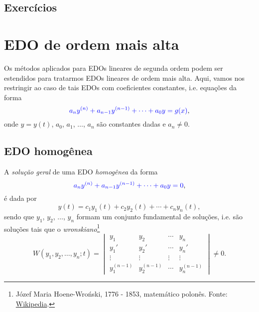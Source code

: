 \subsection*{Exercícios}

\emconstrucao

\section{EDO de ordem mais alta}\label{cap_edolin_sec_edon}

Os métodos aplicados para EDOs lineares de segunda ordem podem ser estendidos para tratarmos EDOs lineares de ordem mais alta. Aqui, vamos nos restringir ao caso de tais EDOs com coeficientes constantes, i.e. equações da forma
\begin{equation}
  {\color{blue}a_ny^{(n)} + a_{n-1}y^{(n-1)} + \cdots + a_0y = g(x)},
\end{equation}
onde $y = y(t)$, $a_0$, $a_1$, $\dotsc$, $a_{n}$ são constantes dadas e $a_n\neq 0$.

\subsection{EDO homogênea}

A \emph{solução geral} de uma EDO \emph{homogênea} da forma
\begin{equation}
  {\color{blue}a_ny^{(n)} + a_{n-1}y^{(n-1)} + \cdots + a_0y = 0},
\end{equation}
é dada por
\begin{equation}
  y(t) = c_1y_1(t) + c_2y_2(t) + \cdots + c_ny_n(t),
\end{equation}
sendo que $y_1$, $y_2$, $\dotsc$, $y_n$ formam um conjunto fundamental de soluções, i.e. são soluções tais que o \emph{wronskiano}\footnote{Józef Maria Hoene-Wroński, 1776 - 1853, matemático polonês. Fonte: \href{https://en.wikipedia.org/w/index.php?title=J\%C3\%B3zef_Maria_Hoene-Wro\%C5\%84ski\&oldid=939986060}{Wikipedia}.}
\begin{equation}
  W(y_1,y_2,\dotsc,y_n;t) =
  \begin{vmatrix}
    y_1 & y_2 & \cdots & y_n \\
    y_1' & y_2' & \cdots & y_n' \\
    \vdots & \vdots & \vdots & \vdots \\
    y_1^{(n-1)} & y_2^{(n-1)} & \cdots & y_n^{(n-1)}
  \end{vmatrix} \neq 0.
\end{equation}


